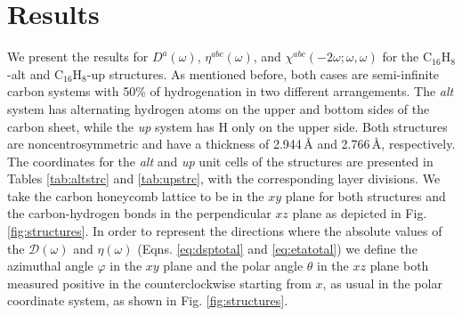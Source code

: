 \documentclass[pss]{wiley2sp} %
\begin{document}
\section{Results}\label{sec:results}

We present the results for {$D^{a}(\omega)$}, {$\eta^{abc}(\omega)$}, and
$\chi^{abc}(-2\omega;\omega,\omega)$ for the C$_{16}$H$_{8}$-alt and
C$_{16}$H$_{8}$-up structures. As mentioned before, both cases are 
semi-infinite carbon systems with 50\% of hydrogenation in two different
arrangements. The \emph{alt} system has alternating hydrogen atoms on the
upper and bottom sides of the carbon sheet, while the \emph{up} system has H
only on the upper side. Both structures are noncentrosymmetric and have a
thickness of 2.944\,{\AA} and 2.766\,{\AA}, respectively. The coordinates for
the \emph{alt} and \emph{up} unit cells of the structures are presented in
Tables \ref{tab:altstrc} and \ref{tab:upstrc}, with the corresponding layer
divisions. We take the carbon honeycomb lattice to be in the $xy$ plane for
both structures and the carbon-hydrogen bonds in the perpendicular $xz$ plane
as depicted in Fig.\ref{fig:structures}. In order to represent the directions
where the absolute values of the $\mathcal{D}(\omega)$ and $\eta(\omega)$
(Eqns. \eqref{eq:dsptotal} and \eqref{eq:etatotal}) we define the azimuthal
angle $\varphi$ in the $xy$ plane and the polar angle $\theta$ in the $xz$
plane both measured positive in the counterclockwise starting from $x$, as
usual in the polar coordinate system, as shown in Fig. \ref{fig:structures}.
\end{document}
